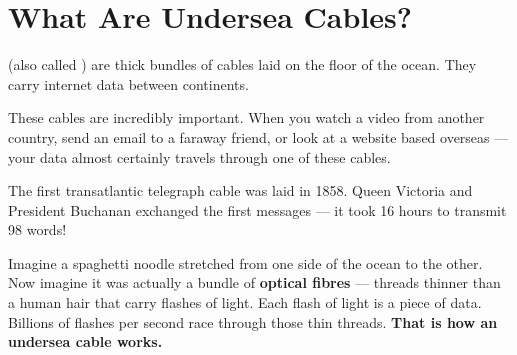 \section*{What Are Undersea Cables?}

 (also called ) are thick bundles of cables
laid on the floor of the ocean.
They carry internet data between continents.

These cables are incredibly important.
When you watch a video from another country, send an email to a faraway friend,
or look at a website based overseas — your data almost certainly travels through one of these cables.

\begin{funfact}
The first transatlantic telegraph cable was laid in 1858. Queen Victoria and President Buchanan exchanged the first messages — it took 16 hours to transmit 98 words!
\end{funfact}

\begin{picturethis}
  Imagine a spaghetti noodle stretched from one side of the ocean to the other.
  Now imagine it was actually a bundle of \textbf{optical fibres} —
  threads thinner than a human hair that carry flashes of light.
  Each flash of light is a piece of data.
  Billions of flashes per second race through those thin threads.
  \textbf{That is how an undersea cable works.}
\end{picturethis}

